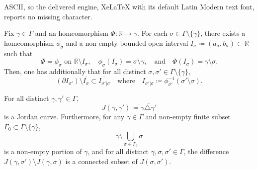 \documentclass[10pt,a4paper]{amsart}
\newcommand{\R}{\mathbb{R}}
\begin{document}
ASCII, so the delivered engine, XeLaTeX with its default Latin Modern text font, reports no missing character.
\begin{lemma}
    \label{lemma_adapted_homeo}
    Fix $\gamma\in\Gamma$ and an homeomorphism $\Phi:\R\to\gamma$. For each $\sigma\in\Gamma\setminus\{\gamma\}$, there exists a homeomorphism $\phi_{\sigma}$ and a non-empty bounded open interval $I_{\sigma}\coloneqq (a_\sigma,b_\sigma)\subset\R$ such that
        \[\text{$\Phi=\phi_\sigma$ on $\R\setminus I_\sigma$},\quad \phi_\sigma(I_\sigma)=\sigma\setminus\gamma,\quad\text{and}\quad \Phi(I_\sigma)=\gamma\setminus\sigma.\]
    Then, one has additionally that for all distinct $\sigma,\sigma'\in\Gamma\setminus\{\gamma\}$,
        \[(\partial I_{\sigma'})\setminus\overline{I_{\sigma}}\subset \overline{I_{\sigma'|\sigma}}\quad\text{where}\quad I_{\sigma'|\sigma}\coloneqq\phi_{\sigma'}^{-1}(\sigma'\setminus\sigma).\]
\end{lemma}

\begin{proposition}
    \label{prop_arc_diff}
    For all distinct $\gamma,\gamma'\in\Gamma$,
        \[J(\gamma,\gamma')\coloneqq\overline{\gamma\triangle\gamma'}\]
    is a Jordan curve. Furthermore, for any $\gamma\in\Gamma$ and non-empty finite subset $\Gamma_0\subset\Gamma\setminus\{\gamma\}$,
        \[\gamma\setminus\bigcup_{\sigma\in\Gamma_0}\sigma\]
    is a non-empty portion of $\gamma$, and for all distinct $\gamma,\sigma,\sigma'\in\Gamma$, the difference $J(\gamma,\sigma')\setminus J(\gamma,\sigma)$ is a connected subset of $J(\sigma,\sigma')$.
\end{proposition}
\end{document}
